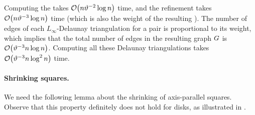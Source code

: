 \documentclass[12pt]{article}%
\begin{document}
Computing the \SSPD takes $\Of\pth{n \epsA^{-2} \log n}$ time, and the
refinement takes $\Of\pth{n \epsA^{-3} \log n}$ time (which is also the
weight of the resulting \SSPD). The number of edges of each
$L_\infty$-Delaunay triangulation for a pair is proportional to its
weight, which implies that the total number of edges in the resulting
graph $G$ is $\Of\pth{ \epsA^{-3} n\log n}$. Computing all these
Delaunay triangulations takes $\Of\pth{ \epsA^{-3}n \log^2 n}$ time.


\paragraph{Shrinking squares.}
We need the following lemma about the shrinking of axis-parallel squares.
Observe that this property definitely does not hold for disks, as
illustrated in .
\end{document}
